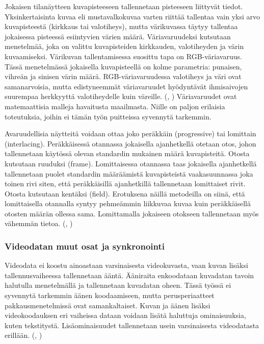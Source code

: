 Jokaisen tilanäytteen kuvapisteeseen tallennetaan pisteeseen liittyvät
tiedot. Yksinkertaisinta kuvaa eli mustavalkokuvaa varten riittää
tallentaa vain yksi arvo kuvapisteestä (kirkkaus tai valotiheys), mutta
värikuvassa täytyy tallentaa jokaisessa pisteessä esiintyvien värien määrä.
Väriavaruudeksi kutsutaan menetelmää, joka on valittu kuvapisteiden kirkkauden,
valotiheyden ja värin kuvaamiseksi. Värikuvan tallentamisessa suosittu tapa on
RGB-väriavaruus. Tässä menetelmässä jokaisella kuvapisteellä on
kolme parametria: punaisen, vihreän ja sinisen värin määrä. RGB-väriavaruudessa 
valotiheys ja väri ovat samanarvoisia, mutta edistyneemmät
väriavaruudet hyödyntävät ihmisaivojen suurempaa herkkyyttä valotiheydelle
kuin väreille. (\citealt{h264}, \citealt{du}) Väriavaruudet ovat matemaattisia
malleja havaitusta maailmasta. Niille on paljon erilaisia toteutuksia,
joihin ei tämän työn puitteissa syvennytä tarkemmin.

Avaruudellisia näytteitä voidaan ottaa joko peräkkäin (progressive) tai
lomittain (interlacing). Peräkkäisessä otannassa jokaisella ajanhetkellä
otetaan otos, johon tallennetaan käytössä olevan standardin mukainen
määrä kuvapisteitä. Otosta kutsutaan ruuduksi (frame). Lomittaisessa
otannassa taas jokaisella ajanhetkellä tallennetaan puolet standardin
määräämistä kuvapisteistä vaakasuunnassa joka toinen rivi siten, että
peräkkäisillä ajanhetkillä tallennetaan lomittaiset rivit. Otosta kutsutaan
kentäksi (field). Erotuksena näillä metodeilla on siinä, että lomittaisella
otannalla syntyy pehmeämmin liikkuvaa kuvaa kuin peräkkäisellä otosten määrän
ollessa sama. Lomittamalla jokaiseen otokseen tallennetaan myös vähemmän tietoa.
(\citealt{h264}, \citealt{du})

\subsubsection{Videodatan muut osat ja synkronointi}

Videodata ei koostu ainoastaan varsinaisesta videokuvasta, vaan kuvan lisäksi
tallennusvaiheessa tallennetaan ääntä. Ääniraita enkoodataan kuvadatan tavoin
halutulla menetelmällä ja tallennetaan kuvadatan oheen. Tässä
työssä ei syvennytä tarkemmin äänen koodaamiseen, mutta perusperiaatteet
pakkausmenetelmissä ovat samankaltaiset. Kuvan ja äänen lisäksi videokoodauksen
eri vaiheissa dataan voidaan lisätä haluttuja ominaisuuksia, kuten tekstitystä.
Lisäominaisuudet tallennetaan usein varsinaisesta videodatasta erillään. (\citealt{mpeg_app},
\citealt{mujal})
 
